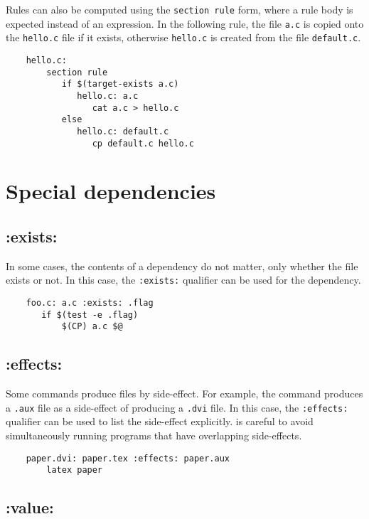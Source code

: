 Rules can also be computed using the \verb+section rule+ form, where a rule body is expected instead
of an expression.  In the following rule, the file \verb+a.c+ is copied onto the \verb+hello.c+ file
if it exists, otherwise \verb+hello.c+ is created from the file \verb+default.c+.

\begin{verbatim}
    hello.c:
        section rule
           if $(target-exists a.c)
              hello.c: a.c
                 cat a.c > hello.c
           else
              hello.c: default.c
                 cp default.c hello.c
\end{verbatim}

\section{Special dependencies}

\subsection{:exists:}

In some cases, the contents of a dependency do not matter, only whether the file exists or not.  In
this case, the \verb+:exists:+ qualifier can be used for the dependency.

\begin{verbatim}
    foo.c: a.c :exists: .flag
       if $(test -e .flag)
           $(CP) a.c $@
\end{verbatim}

\subsection{:effects:}

Some commands produce files by side-effect.  For example, the
 command produces a \verb+.aux+ file as a side-effect of
producing a \verb+.dvi+ file.  In this case, the \verb+:effects:+
qualifier can be used to list the side-effect explicitly.
 is careful to avoid simultaneously running programs that
have overlapping side-effects.

\begin{verbatim}
    paper.dvi: paper.tex :effects: paper.aux
        latex paper
\end{verbatim}

\subsection{:value:}


